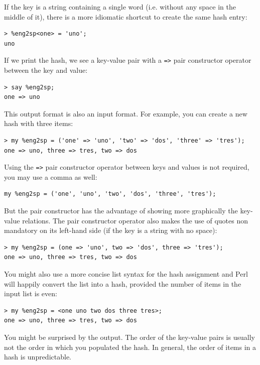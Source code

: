 If the key is a string containing a single word (i.e. 
without any space in the middle of it), there is a more 
idiomatic shortcut to create the same hash entry:

\begin{verbatim}
> %eng2sp<one> = 'uno';
uno
\end{verbatim}
%

If we print the hash, we see a key-value pair with a 
\verb'=>' pair constructor operator between the key 
and value:

\begin{verbatim}
> say %eng2sp;
one => uno
\end{verbatim}
%
This output format is also an input format.  For example,
you can create a new hash with three items:

\begin{verbatim}
> my %eng2sp = ('one' => 'uno', 'two' => 'dos', 'three' => 'tres');
one => uno, three => tres, two => dos
\end{verbatim}
%

Using the \verb'=>' pair constructor operator between keys and 
values is not required, you may use a comma as well:

\begin{verbatim}
my %eng2sp = ('one', 'uno', 'two', 'dos', 'three', 'tres');
\end{verbatim}
%

But the pair constructor has the advantage of showing more 
graphically the key-value relations. The pair constructor 
operator also makes the use of quotes non mandatory on its 
left-hand side (if the key is a string with no space):

\begin{verbatim}
> my %eng2sp = (one => 'uno', two => 'dos', three => 'tres');
one => uno, three => tres, two => dos
\end{verbatim}
%

You might also use a more concise list syntax for the hash 
assignment and Perl will happily convert the list into a 
hash, provided the number of items in the input list is even:

\begin{verbatim}
> my %eng2sp = <one uno two dos three tres>;
one => uno, three => tres, two => dos
\end{verbatim}
%

You might be surprised by the output. The order of the 
key-value pairs is usually not the order in which you 
populated the hash. In general, the order 
of items in a hash is unpredictable.

